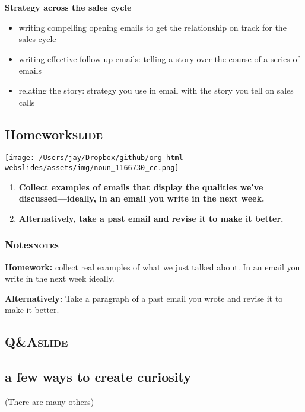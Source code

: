 \documentclass[12pt]{article}
\begin{document}
\textbf{Strategy across the sales cycle}
\begin{itemize}
\item writing compelling opening emails to get the relationship on track for the sales cycle
\item writing effective follow-up emails: telling a story over the course of a series of emails
\item relating the story: strategy you use in email with the story you tell on sales calls
\end{itemize}


\subsection[Homework]{Homework\hfill{}\textsc{slide}}
\label{sec:org4cbaa4c}

\begin{center}
\texttt{[image: /Users/jay/Dropbox/github/org-html-webslides/assets/img/noun\_1166730\_cc.png]}
\end{center}

\begin{enumerate}
\item \textbf{Collect examples of emails that display the qualities we've discussed---ideally, in an email you write in the next week.}
\item \textbf{Alternatively, take a past email and revise it to make it better.}
\end{enumerate}


\subsubsection[Notes]{Notes\hfill{}\textsc{notes}}
\label{sec:orgf217344}
\textbf{Homework:} collect real examples of what we just talked about. In an email you write in the next week ideally.

\textbf{Alternatively:} Take a paragraph of a past email you wrote and revise it to make it better.

\subsection[Q\&A]{Q\&A\hfill{}\textsc{slide}}
\label{sec:org38173c2}

\subsection{a few ways to create curiosity}
\label{sec:org6a57bd1}
(There are many others)
\end{document}
